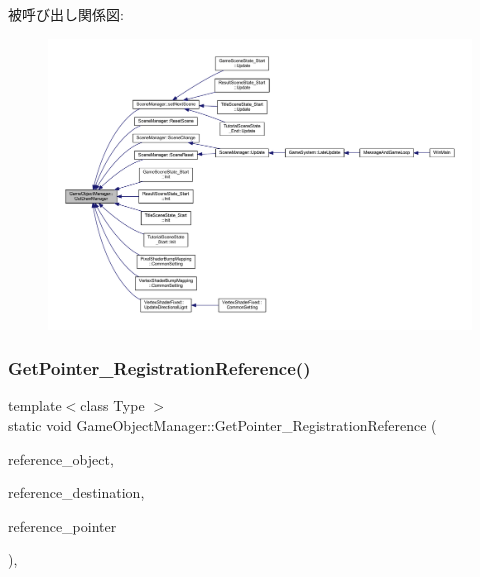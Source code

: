 被呼び出し関係図\+:
\nopagebreak
\begin{figure}[H]
\begin{center}
\leavevmode
\includegraphics[width=350pt]{class_game_object_manager_a862e76bfd74495c20bddd377c62a22b7_icgraph}
\end{center}
\end{figure}
\mbox{\label{class_game_object_manager_a4b905d160c31b234686a3d46c0743adb}} 
\subsubsection{\texorpdfstring{Get\+Pointer\+\_\+\+Registration\+Reference()}{GetPointer\_RegistrationReference()}}
{\footnotesize\ttfamily template$<$class Type $>$ \\
static void Game\+Object\+Manager\+::\+Get\+Pointer\+\_\+\+Registration\+Reference (\begin{DoxyParamCaption}\item[{\mbox{\hyperlink{class_game_object_base}{Game\+Object\+Base}} $\ast$}]{reference\+\_\+object,  }\item[{Type $\ast$}]{reference\+\_\+destination,  }\item[{Type $\ast$}]{reference\+\_\+pointer }\end{DoxyParamCaption})\hspace{0.3cm}{\ttfamily [inline]}, {\ttfamily [static]}}



